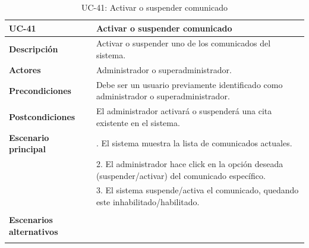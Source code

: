 \begin{table}
  \begin{center}
    \begin{tabularx}{16.4cm}{|l|X|}
      \hline
      \textbf{UC-41} & \textbf{Activar o suspender comunicado}\\
      \hline
      \textbf{Descripción} & Activar o suspender uno de los comunicados del sistema.\\
      \hline
      \textbf{Actores} & Administrador o superadministrador.\\
      \hline
      \textbf{Precondiciones} & Debe ser un usuario previamente identificado como administrador o superadministrador.\\
      \hline
      \textbf{Postcondiciones} & El administrador activará o suspenderá una cita existente en el sistema.\\
      \hline
      \textbf{Escenario principal} & \smallskip 1. El sistema muestra la lista de comunicados actuales.\\
      & 2. El administrador hace click en la opción deseada (suspender/activar) del comunicado específico.\\
      & 3. El sistema suspende/activa el comunicado, quedando este inhabilitado/habilitado.\\
      & \\
      \hline
      \textbf{Escenarios alternativos} & \smallskip \\
      & \\
      \hline
    \end{tabularx}
    \caption{UC-41: Activar o suspender comunicado}
    \label{tab:CU-activar-suspender-comunicado}
  \end{center}
\end{table}


